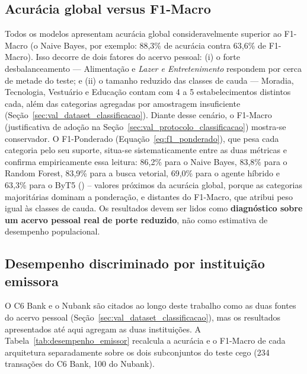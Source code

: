 \subsection{Acurácia global versus F1-Macro}
Todos os modelos apresentam acurácia global consideravelmente superior ao F1-Macro (o Naive
Bayes, por exemplo: 88,3\% de acurácia contra
63,6\% de F1-Macro). Isso decorre de dois fatores do acervo pessoal:
(i) o forte desbalanceamento --- Alimentação e \textit{Lazer e
Entretenimento} respondem por cerca de metade do teste; e (ii) o tamanho reduzido das
classes de cauda --- Moradia, Tecnologia, Vestuário e
Educação contam com 4 a 5 estabelecimentos distintos cada, além das categorias
agregadas por amostragem insuficiente (Seção~\ref{sec:val_dataset_classificacao}). Diante desse
cenário, o F1-Macro (justificativa de adoção na Seção~\ref{sec:val_protocolo_classificacao})
mostra-se conservador. O F1-Ponderado (Equação~\ref{eq:f1_ponderado}), que pesa cada categoria pelo seu suporte, situa-se sistematicamente entre as duas métricas e confirma empiricamente essa leitura: 86,2\% para o Naive Bayes, 83,8\% para o Random Forest, 83,9\% para a busca vetorial, 69,0\% para o agente híbrido e 63,3\% para o ByT5 () -- valores próximos da acurácia global, porque as categorias majoritárias dominam a ponderação, e distantes do F1-Macro, que atribui peso igual às classes de cauda. Os resultados devem ser lidos
como \textbf{diagnóstico sobre um acervo pessoal real de porte reduzido}, não como
estimativa de desempenho populacional.

\subsection{Desempenho discriminado por instituição emissora}
\label{sec:val_desempenho_emissor}

O C6 Bank e o Nubank são citados ao longo deste trabalho como as duas fontes do acervo pessoal (Seção~\ref{sec:val_dataset_classificacao}), mas os resultados apresentados até aqui agregam as duas instituições. A Tabela~\ref{tab:desempenho_emissor} recalcula a acurácia e o F1-Macro de cada arquitetura separadamente sobre os dois subconjuntos do teste cego (234 transações do C6 Bank, 100 do Nubank).

